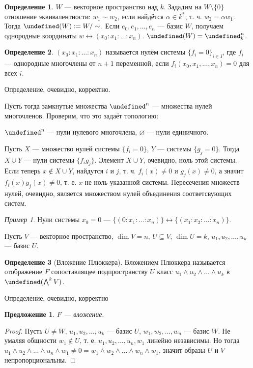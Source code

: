 \documentclass{article}
\newtheorem*{proposition}{Предложение}
\theoremstyle{definition}
\newtheorem*{definition}{Определение}
\theoremstyle{remark}
\newtheorem*{example}{Пример}
\let\P\undefined
\DeclareMathOperator{\P}{\mathbb{P}}
\begin{document}
\begin{definition}
$W$ --- векторное пространство над $k$. Зададим на $W \setminus \{0\}$ отношение эквивалентности: $w_1 \sim w_2$, если найдётся $\alpha \in k^*$, т. ч. $w_2 = \alpha w_1$. Тогда $\P(W) := W /\sim$. Если $e_0, e_1, \ldots, e_n$ --- базис $W$, получаем однородные координаты $w \leftrightarrow (x_0: x_1: \ldots: x_n)$. $\P(W) = \P_k^n$.
\end{definition}

\begin{definition}
$(x_0: x_1: \ldots: x_n)$ называется нулём системы $\{f_i = 0\}_{i \in I}$, где $f_i$ --- однородные многочлены от $n + 1$ переменной, если $f_i(x_0, x_1, \ldots, x_n) = 0$ для всех $i$.
\end{definition}

Определение, очевидно, корректно.

Пусть тогда замкнутые множества $\P^n$ --- множества нулей многочленов. Проверим, что это задаёт топологию:

$\P^n$ --- нули нулевого многочлена, $\varnothing$ --- нули единичного.

Пусть $X$ --- множество нулей системы $\{f_i = 0\}$, $Y$ --- системы $\{g_j = 0\}$. Тогда $X \cup Y$ --- нули системы $\{f_ig_j\}$. Элемент $X \cup Y$, очевидно, ноль этой системы. Если теперь $x \notin X \cup Y$, найдутся $i$ и $j$, т. ч. $f_i(x) \neq 0$ и $g_j(x) \neq 0$, а значит $f_i(x) g_j(x) \neq 0$, т. е. $x$ не ноль указанной системы. Пересечения множеств нулей, очевидно, является множеством нулей объединения соответсвующих систем.

\begin{example}
Нули системы $x_0 = 0$ --- $\{(0: x_1: \ldots: x_n)\} \leftrightarrow \{(x_1 : x_2: \ldots: x_n)\}$.
\end{example}

Пусть $V$ --- векторное пространство, $\dim V  = n$, $U \subseteq V$, $\dim U = k$, $u_1, u_2, \ldots, u_k$ --- базис $U$.

\begin{definition}[Вложение Плюккера]
Вложением Плюккера называется отображение $F$ сопоставлящее подпространству $U$ класс $u_1 \wedge u_2 \wedge \ldots \wedge u_k$ в $\P(\bigwedge^k V)$.
\end{definition}

Определение, очевидно, корректно

\begin{proposition}
$F$ --- вложение.
\end{proposition}
\begin{proof}
Пусть $U \neq W$, $u_1, u_2, \ldots, u_k$ --- базис $U$, $w_1, w_2, \ldots, w_n$ --- базис $W$. Не умаляя общности $w_1 \notin U$, т. е. $u_1, u_2, \ldots, u_n, w_1$ линейно независимы. Но тогда $u_1 \wedge u_2 \wedge \ldots \wedge u_n \wedge w_1 \neq 0 = w_1 \wedge w_2 \wedge \ldots \wedge w_n \wedge w_1$, значит образы $U$ и $V$ непропорциональны.
\end{proof}
\end{document}

